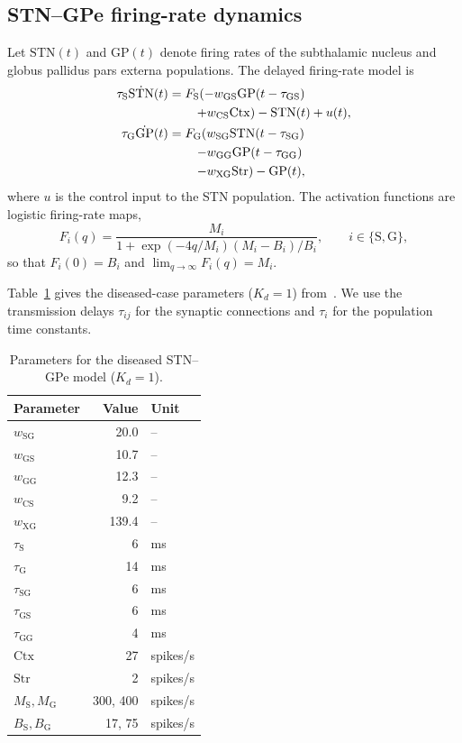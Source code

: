 \documentclass[9pt,twocolumn,twoside]{pnas-new}
\newcommand{\mrm}[1]{\mathrm{#1}}
\newcommand{\STN}{\mathrm{STN}}
\newcommand{\GP}{\mathrm{GP}}
\newcommand{\Ctx}{\mathrm{Ctx}}
\newcommand{\Str}{\mathrm{Str}}
\newcommand{\Srate}{\mathrm{S}}
\newcommand{\Grate}{\mathrm{G}}
\begin{document}
\subsection{STN--GPe firing-rate dynamics}

Let $\STN(t)$ and $\GP(t)$ denote firing rates of the subthalamic nucleus and globus pallidus pars externa populations. The delayed firing-rate model is
\begin{align}
\tau_{\Srate}\dot{\STN}(t)
 &=F_{\Srate}\!\left(-w_{\mrm{GS}}\GP(t-\tau_{\mrm{GS}})
   \right.\notag\\
 &\qquad\left.+w_{\mrm{CS}}\Ctx\right)-\STN(t)+u(t),\\
\tau_{\Grate}\dot{\GP}(t)
 &=F_{\Grate}\!\left(
   w_{\mrm{SG}}\STN(t-\tau_{\mrm{SG}})
   \right.\notag\\
 &\qquad\left.
   -w_{\mrm{GG}}\GP(t-\tau_{\mrm{GG}})
   \right.\notag\\
  &\qquad\left.
   -w_{\mrm{XG}}\Str\right)-\GP(t),
\label{eq:original-model}
\end{align}
where $u$ is the control input to the STN population. The activation functions are logistic firing-rate maps,
\begin{equation}
F_i(q)=\frac{M_i}{1+\exp(-4q/M_i)(M_i-B_i)/B_i},
\qquad i\in\{\Srate,\Grate\},
\label{eq:activation}
\end{equation}
so that $F_i(0)=B_i$ and $\lim_{q\to\infty}F_i(q)=M_i$.

Table~\ref{tab:parameters} gives the diseased-case parameters ($K_d=1$) from~\cite{nevadoHolgado2010betaOscillations}. We use the transmission delays $\tau_{ij}$ for the synaptic connections and $\tau_i$ for the population time constants.

\begin{table}[t]
\centering
\caption{Parameters for the diseased STN--GPe model ($K_d=1$).}
\label{tab:parameters}
\small
\begin{tabular}{@{}lrl@{}}
\toprule
Parameter & Value & Unit \\
\midrule
$w_{\mrm{SG}}$ & 20.0 & -- \\
$w_{\mrm{GS}}$ & 10.7 & -- \\
$w_{\mrm{GG}}$ & 12.3 & -- \\
$w_{\mrm{CS}}$ & 9.2 & -- \\
$w_{\mrm{XG}}$ & 139.4 & -- \\
\midrule
$\tau_{\Srate}$ & 6 & ms \\
$\tau_{\Grate}$ & 14 & ms \\
$\tau_{\mrm{SG}}$ & 6 & ms \\
$\tau_{\mrm{GS}}$ & 6 & ms \\
$\tau_{\mrm{GG}}$ & 4 & ms \\
\midrule
$\Ctx$ & 27 & spikes/s \\
$\Str$ & 2 & spikes/s \\
$M_{\Srate},M_{\Grate}$ & 300, 400 & spikes/s \\
$B_{\Srate},B_{\Grate}$ & 17, 75 & spikes/s \\
\bottomrule
\end{tabular}
\end{table}
\end{document}
